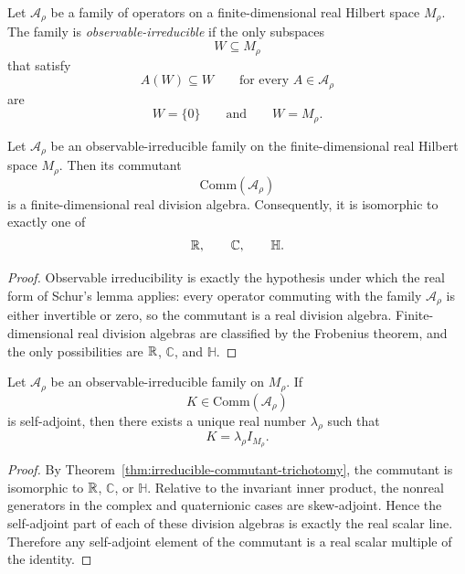 \begin{definition}
\label{def:observable-irreducibility}
Let $\mathcal A_{\rho}$ be a family of operators on a finite-dimensional real
Hilbert space $M_{\rho}$. The family is \emph{observable-irreducible} if the
only subspaces
\[
W\subseteq M_{\rho}
\]
that satisfy
\[
A(W)\subseteq W
\qquad\text{for every }A\in\mathcal A_{\rho}
\]
are
\[
W=\{0\}
\qquad\text{and}\qquad
W=M_{\rho}.
\]
\end{definition}

\begin{theorem}
\label{thm:irreducible-commutant-trichotomy}
Let $\mathcal A_{\rho}$ be an observable-irreducible family on the
finite-dimensional real Hilbert space $M_{\rho}$. Then its commutant
\[
\mathrm{Comm}(\mathcal A_{\rho})
\]
is a finite-dimensional real division algebra. Consequently, it is isomorphic
to exactly one of
\[
\mathbb{R},\qquad \mathbb{C},\qquad \mathbb{H}.
\]
\end{theorem}

\begin{proof}
Observable irreducibility is exactly the hypothesis under which the real form
of Schur's lemma applies: every operator commuting with the family
$\mathcal A_{\rho}$ is either invertible or zero, so the commutant is a real
division algebra. Finite-dimensional real division algebras are classified by
the Frobenius theorem, and the only possibilities are $\mathbb{R}$, $\mathbb{C}$,
and $\mathbb{H}$.
\end{proof}

\begin{corollary}
\label{cor:self-adjoint-commutant-scalarization}
Let $\mathcal A_{\rho}$ be an observable-irreducible family on
$M_{\rho}$. If
\[
K\in\mathrm{Comm}(\mathcal A_{\rho})
\]
is self-adjoint, then there exists a unique real number $\lambda_{\rho}$ such
that
\[
K=\lambda_{\rho}I_{M_{\rho}}.
\]
\end{corollary}

\begin{proof}
By Theorem~\ref{thm:irreducible-commutant-trichotomy}, the commutant is
isomorphic to $\mathbb{R}$, $\mathbb{C}$, or $\mathbb{H}$. Relative to the invariant
inner product, the nonreal generators in the complex and quaternionic cases
are skew-adjoint. Hence the self-adjoint part of each of these division
algebras is exactly the real scalar line. Therefore any self-adjoint element
of the commutant is a real scalar multiple of the identity.
\end{proof}

